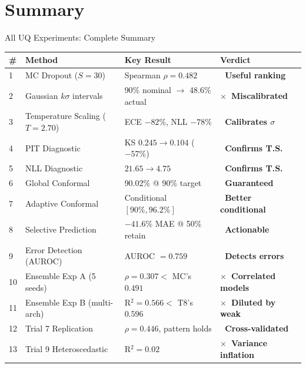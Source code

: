 \documentclass[aspectratio=169,10pt]{beamer}
\newcommand{\emphred}[1]{\textcolor{tumred}{\textbf{#1}}}
\newcommand{\emphgreen}[1]{\textcolor{tumgreen}{\textbf{#1}}}
\newcommand{\tick}{\textcolor{tumgreen}{\checkmark}}
\newcommand{\cross}{\textcolor{tumred}{$\times$}}
\begin{document}
\section{Summary}

\begin{frame}{All UQ Experiments: Complete Summary}
  \centering
  \renewcommand{\arraystretch}{1.25}
  \footnotesize
  \begin{tabular}{llll}
    \toprule
    \textbf{\#} & \textbf{Method} & \textbf{Key Result} & \textbf{Verdict} \\
    \midrule
    1 & MC Dropout ($S=30$) & Spearman $\rho = 0.482$ & \emphgreen{\tick\ Useful ranking} \\
    2 & Gaussian $k\sigma$ intervals & 90\% nominal $\to$ 48.6\% actual & \emphred{\cross\ Miscalibrated} \\
    3 & Temperature Scaling ($T=2.70$) & ECE $-82\%$, NLL $-78\%$ & \emphgreen{\tick\ Calibrates $\sigma$} \\
    4 & PIT Diagnostic & KS $0.245 \to 0.104$ ($-57\%$) & \emphgreen{\tick\ Confirms T.S.} \\
    5 & NLL Diagnostic & $21.65 \to 4.75$ & \emphgreen{\tick\ Confirms T.S.} \\
    6 & Global Conformal & 90.02\% @ 90\% target & \emphgreen{\tick\ Guaranteed} \\
    7 & Adaptive Conformal & Conditional $[90\%, 96.2\%]$ & \emphgreen{\tick\ Better conditional} \\
    8 & Selective Prediction & $-41.6\%$ MAE @ 50\% retain & \emphgreen{\tick\ Actionable} \\
    9 & Error Detection (AUROC) & AUROC $= 0.759$ & \emphgreen{\tick\ Detects errors} \\
    \midrule
    10 & Ensemble Exp A (5 seeds) & $\rho = 0.307 <$ MC's $0.491$ & \emphred{\cross\ Correlated models} \\
    11 & Ensemble Exp B (multi-arch) & R$^2 = 0.566 <$ T8's $0.596$ & \emphred{\cross\ Diluted by weak} \\
    \midrule
    12 & Trial 7 Replication & $\rho = 0.446$, pattern holds & \emphgreen{\tick\ Cross-validated} \\
    13 & Trial 9 Heteroscedastic & R$^2 = 0.02$ & \emphred{\cross\ Variance inflation} \\
    \bottomrule
  \end{tabular}
\end{frame}
\end{document}
